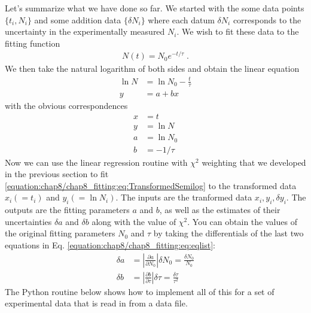 \documentclass[letterpaper,10pt,english]{sphinxmanual}
\begin{document}
\sphinxAtStartPar
Let’s summarize what we have done so far.  We started with the some data points \(\{t_i,N_i\}\) and some addition data \(\{\delta N_i\}\) where each datum \(\delta N_i\) corresponds to the uncertainty in the experimentally measured \(N_i\).  We wish to fit these data to the fitting function
\begin{equation*}
\begin{split}N(t) = N_0 e^{-t/\tau} \;.\end{split}
\end{equation*}
\sphinxAtStartPar
We then take the natural logarithm of both sides and obtain the linear equation
\begin{equation}\label{equation:chap8/chap8_fitting:eq:TransformedSemilog}
\begin{split}\ln N &= \ln N_{0} -\frac{t}{\tau} \\
y &= a + bx\end{split}
\end{equation}
\sphinxAtStartPar
with the obvious correspondences
\begin{equation}\label{equation:chap8/chap8_fitting:eq:eqlist}
\begin{split}x &= t\\
y &= \ln N\\
a &= \ln N_{0}\\
b &= -1/\tau\end{split}
\end{equation}
\sphinxAtStartPar
Now we can use the linear regression routine with \(\chi^2\) weighting that we developed in the previous section to fit  \eqref{equation:chap8/chap8_fitting:eq:TransformedSemilog} to the transformed data \(x_i (= t_i)\) and  \(y_i (= \ln N_i)\).  The inputs are the tranformed data \({x_i}, {y_i}, {\delta y_i}\).  The outputs are the fitting parameters \(a\) and \(b\), as well as the estimates of their uncertainties \(\delta a\) and \(\delta b\) along with the value of \(\chi^2\).  You can obtain the values of the original fitting parameters \(N_0\) and \(\tau\) by taking the differentials of the last two equations in Eq. \eqref{equation:chap8/chap8_fitting:eq:eqlist}:
\begin{equation}\label{equation:chap8/chap8_fitting:eq:paramunc}
\begin{split}\delta a &= \left|\frac{\partial a}{\partial N_0}\right|\delta N_0
          = \frac{\delta N_{0}}{N_{0}}\\
\delta b &= \left|\frac{\partial b}{\partial \tau}\right|\delta \tau
          = \frac{\delta \tau}{\tau^2}\end{split}
\end{equation}
\sphinxAtStartPar
The Python routine below shows how to implement all of this for a set of experimental data that is read in from a data file.
\end{document}
